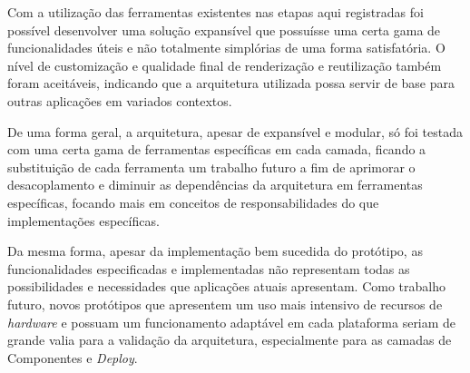 Com a utilização das ferramentas existentes nas etapas aqui registradas foi possível desenvolver uma solução expansível que possuísse uma certa gama de funcionalidades úteis e não totalmente simplórias de uma forma satisfatória. O nível de customização e qualidade final de renderização e reutilização também foram aceitáveis, indicando que a arquitetura utilizada possa servir de base para outras aplicações em variados contextos.

De uma forma geral, a arquitetura, apesar de expansível e modular, só foi testada com uma certa gama de ferramentas específicas em cada camada, ficando a substituição de cada ferramenta um trabalho futuro a fim de aprimorar o desacoplamento e diminuir as dependências da arquitetura em ferramentas específicas, focando mais em conceitos de responsabilidades do que implementações específicas.

Da mesma forma, apesar da implementação bem sucedida do protótipo, as funcionalidades especificadas e implementadas não representam todas as possibilidades e necessidades que aplicações atuais apresentam. Como trabalho futuro, novos protótipos que apresentem um uso mais intensivo de recursos de \textit{hardware} e possuam um funcionamento adaptável em cada plataforma seriam de grande valia para a validação da arquitetura, especialmente para as camadas de Componentes e \textit{Deploy}.